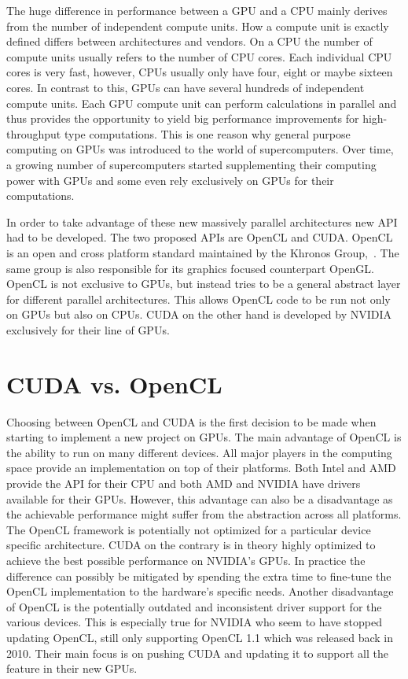 The huge difference in performance between a GPU and a CPU mainly derives from the number of independent compute units. How a compute unit is exactly defined differs between architectures and vendors. On a CPU the number of compute units usually refers to the number of CPU cores. Each individual CPU cores is very fast, however, CPUs usually only have four, eight or maybe sixteen cores. In contrast to this, GPUs can have several hundreds of independent compute units. Each GPU compute unit can perform calculations in parallel and thus provides the opportunity to yield big performance improvements for high-throughput type computations. This is one reason why general purpose computing on GPUs was introduced to the world of supercomputers. Over time, a growing number of supercomputers started supplementing their computing power with GPUs and some even rely exclusively on GPUs for their computations.

In order to take advantage of these new massively parallel architectures new API had to be developed. The two proposed APIs are OpenCL and CUDA. OpenCL is an open and cross platform standard maintained by the Khronos Group,~\cite{OpenCL}. The same group is also responsible for its graphics focused counterpart OpenGL. OpenCL is not exclusive to GPUs, but instead tries to be a general abstract layer for different parallel architectures. This allows OpenCL code to be run not only on GPUs but also on CPUs. CUDA on the other hand is developed by NVIDIA exclusively for their line of GPUs.

\section{CUDA vs. OpenCL}

Choosing between OpenCL and CUDA is the first decision to be made when starting to implement a new project on GPUs. The main advantage of OpenCL is the ability to run on many different devices. All major players in the computing space provide an implementation on top of their platforms. Both Intel and AMD provide the API for their CPU and both AMD and NVIDIA have drivers available for their GPUs. However, this advantage can also be a disadvantage as the achievable performance might suffer from the abstraction across all platforms. The OpenCL framework is potentially not optimized for a particular device specific architecture. CUDA on the contrary is in theory highly optimized to achieve the best possible performance on NVIDIA's GPUs. In practice the difference can possibly be mitigated by spending the extra time to fine-tune the OpenCL implementation to the hardware's specific needs. Another disadvantage of OpenCL is the potentially outdated and inconsistent driver support for the various devices. This is especially true for NVIDIA who seem to have stopped updating OpenCL, still only supporting OpenCL 1.1 which was released back in 2010. Their main focus is on pushing CUDA and updating it to support all the feature in their new GPUs.

